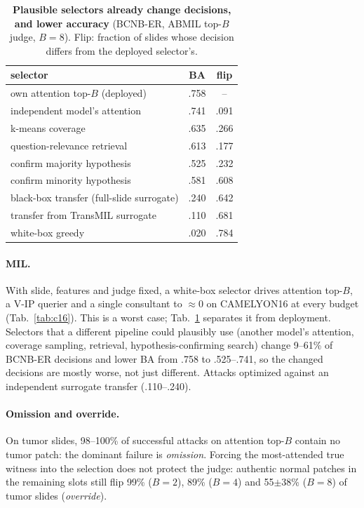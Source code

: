 \documentclass[10pt,twocolumn,letterpaper]{article}
\begin{document}
\begin{table}[t]\centering\small
\caption{\textbf{Plausible selectors already change decisions, and lower accuracy} (BCNB-ER, ABMIL top-$B$ judge, $B{=}8$). Flip: fraction of slides whose decision differs from the deployed selector's.}\label{tab:natural}
\begin{tabular}{@{}lcc@{}}\toprule
selector & BA & flip\\\midrule
own attention top-$B$ (deployed) & .758 & --\\
independent model's attention & .741 & .091\\
k-means coverage & .635 & .266\\
question-relevance retrieval & .613 & .177\\
confirm majority hypothesis & .525 & .232\\
confirm minority hypothesis & .581 & .608\\\midrule
black-box transfer (full-slide surrogate) & .240 & .642\\
transfer from TransMIL surrogate & .110 & .681\\
white-box greedy & .020 & .784\\\bottomrule
\end{tabular}\end{table}

\paragraph{MIL.} With slide, features and judge fixed, a white-box selector drives attention top-$B$, a V-IP querier and a single consultant to $\approx$0 on CAMELYON16 at every budget (Tab.~\ref{tab:c16}). This is a worst case; Tab.~\ref{tab:natural} separates it from deployment. Selectors that a different pipeline could plausibly use (another model's attention, coverage sampling, retrieval, hypothesis-confirming search) change 9--61\% of BCNB-ER decisions and lower BA from .758 to .525--.741, so the changed decisions are mostly worse, not just different. Attacks optimized against an independent surrogate transfer (.110--.240).
\paragraph{Omission and override.} On tumor slides, 98--100\% of successful attacks on attention top-$B$ contain no tumor patch: the dominant failure is \emph{omission}. Forcing the most-attended true witness into the selection does not protect the judge: authentic normal patches in the remaining slots still flip 99\% ($B{=}2$), 89\% ($B{=}4$) and 55$\pm$38\% ($B{=}8$) of tumor slides (\emph{override}).
\end{document}
